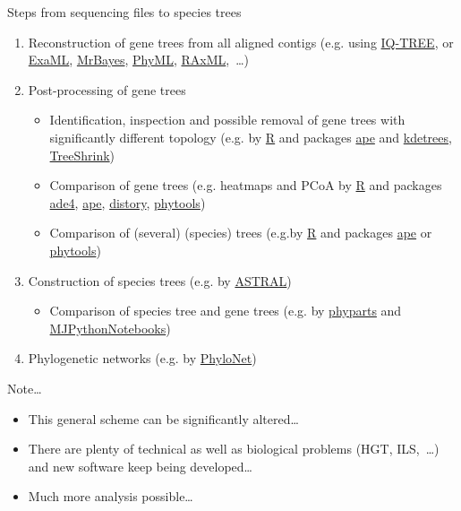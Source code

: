 \documentclass[compress, ucs, xelatex, 11pt, xcolor=x11names, aspectratio=169,
	hyperref={
		bookmarks=true,
		unicode=true,
		colorlinks=true,
		pdftitle={HybSeq course},
		plainpages=false,
		pdfauthor={Vojtech Zeisek},
		pdfsubject={Practical processing of HybSeq target enrichment sequencing data on computing grids like MetaCentrum},
		pdfcreator={XeLaTeX},
		pdfkeywords={BASH, command line, GNU, HybSeq, Linux, MetaCentrum, sequencing shell, target enrichment},
		linkcolor=Cyan2, %
		anchorcolor=Firebrick2, %
		citecolor=Firebrick2, %
		filecolor=Firebrick2, %
		menucolor=Firebrick2, %
		urlcolor=Chartreuse2, %
		pdftex},
	url={hyphens, lowtilde} %
	]{beamer}
\begin{document}
\begin{frame}[allowframebreaks]{Steps from sequencing files to species trees}
\begin{enumerate}
		\item Reconstruction of gene trees from all aligned contigs (e.g. using \href{http://www.iqtree.org/}{IQ-TREE}, or \href{https://github.com/stamatak/ExaML}{ExaML}, \href{https://nbisweden.github.io/MrBayes/}{MrBayes}, \href{http://www.atgc-montpellier.fr/phyml/}{PhyML}, \href{https://github.com/stamatak/standard-RAxML}{RAxML},~\ldots)
		\item Post-processing of gene trees
		\begin{itemize}
			\item Identification, inspection and possible removal of gene trees with significantly different topology (e.g. by \href{https://www.r-project.org/}{R} and packages \href{https://cran.r-project.org/package=ape}{ape} and \href{https://cran.r-project.org/package=kdetrees}{kdetrees}, \href{https://github.com/uym2/TreeShrink}{TreeShrink})
			\item Comparison of gene trees (e.g. heatmaps and PCoA by \href{https://www.r-project.org/}{R} and packages \href{https://cran.r-project.org/package=ade4}{ade4}, \href{https://cran.r-project.org/package=ape}{ape}, \href{https://cran.r-project.org/package=distory}{distory}, \href{https://cran.r-project.org/package=phytools}{phytools})
			\item Comparison of (several) (species) trees (e.g.by \href{https://www.r-project.org/}{R} and packages \href{https://cran.r-project.org/package=ape}{ape} or \href{https://cran.r-project.org/package=phytools}{phytools})
		\end{itemize}
		\item Construction of species trees (e.g. by \href{https://github.com/smirarab/ASTRAL}{ASTRAL})
		\begin{itemize}
			\item Comparison of species tree and gene trees (e.g. by \href{https://bitbucket.org/blackrim/phyparts}{phyparts} and \href{https://github.com/mossmatters/MJPythonNotebooks}{MJPythonNotebooks})
		\end{itemize}
		\item Phylogenetic networks (e.g. by \href{https://bioinfocs.rice.edu/PhyloNet}{PhyloNet})
	\end{enumerate}
	\vfill
	\begin{block}{Note\ldots}
		\begin{itemize}
			\item This general scheme can be significantly altered\ldots
			\item There are plenty of technical as well as biological problems (HGT, ILS,~\ldots) and new software keep being developed\ldots
			\item Much more analysis possible\ldots
		\end{itemize}
	\end{block}
	\vfill
\end{frame}
\end{document}
